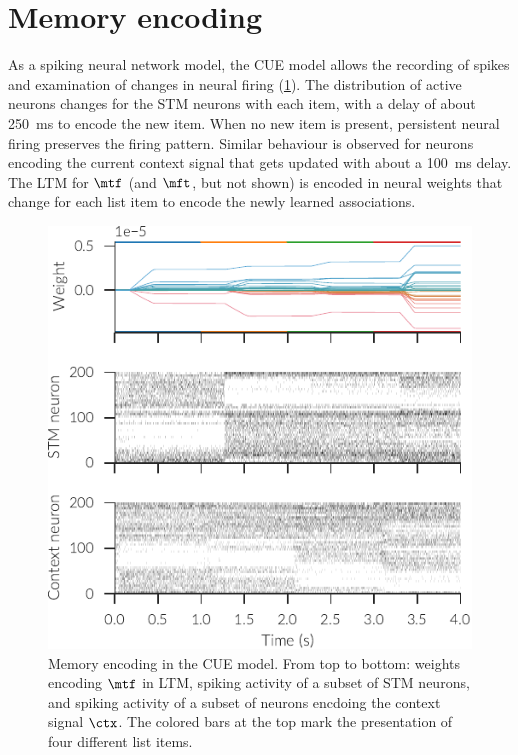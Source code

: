 \section{Memory encoding}
As a spiking neural network model, the CUE model allows the recording of spikes and examination of changes in neural firing (\cref{fig:spikes}).
The distribution of active neurons changes for the STM neurons with each item, with a delay of about \SI{250}{\milli\second} to encode the new item.
When no new item is present, persistent neural firing preserves the firing pattern.
Similar behaviour is observed for neurons encoding the current context signal that gets updated with about a \SI{100}{\milli\second} delay.
The LTM for $\mtf$ (and $\mft$, but not shown) is encoded in neural weights that change for each list item to encode the newly learned associations.
\begin{figure}
    \centering
    \includegraphics{figures/spikes}
    \caption[Memory encoding in the CUE model.]{Memory encoding in the CUE model. From top to bottom: weights encoding $\mtf$ in LTM, spiking activity of a subset of STM neurons, and spiking activity of a subset of neurons encdoing the context signal $\ctx$. The colored bars at the top mark the presentation of four different list items.}\label{fig:spikes}
\end{figure}

